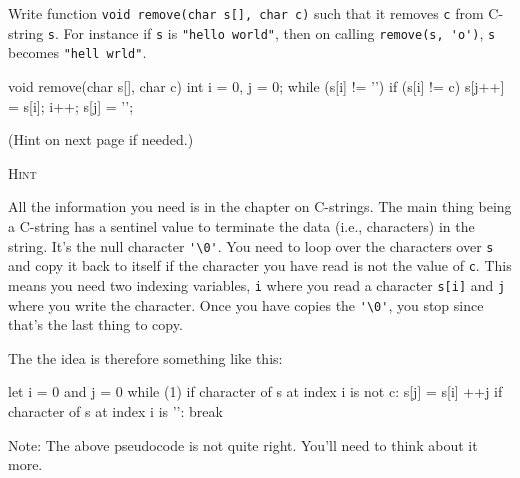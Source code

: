 

\nextq
Write function
\verb!void remove(char s[], char c)!
such that it removes \verb!c! from C-string \verb!s!.
For instance if \verb!s! is \verb!"hello world"!,
then on calling \verb!remove(s, 'o')!,
\verb!s! becomes \verb!"hell wrld"!.
\\
\ANSWER
\begin{answercode}
  void remove(char s[], char c)
  {
    int i = 0, j = 0;
    while (s[i] != '\0')
    {
      if (s[i] != c)
      {
        s[j++] = s[i];
      }
      i++;
    }
    s[j] = '\0';
  }
\end{answercode}
(Hint on next page if needed.)

\newpage
\textsc{Hint}

All the information you need is in the chapter on C-strings.
The main thing being a C-string has a sentinel value to terminate
the data (i.e., characters) in the string.
It's the null character \verb!'\0'!.
You need to loop over the characters over \verb!s!
and copy it back to itself if the character you have read is not
the value of \verb!c!.
This means you need two indexing variables,
\verb!i! where you read a character \verb!s[i]!
and \verb!j! where you write the character.
Once you have copies the \verb!'\0'!, you stop since that's the last
thing to copy.

The the idea is therefore something like this:
\begin{console}[frame=single,fontsize]
let i = 0 and j = 0
while (1)
    if character of s at index i is not c:
        s[j] = s[i]
        ++j
    if character of s at index i is '\0':
        break
\end{console}
Note: The above pseudocode is not quite right.
You'll need to think about it more.


